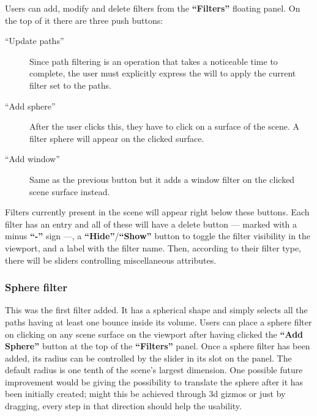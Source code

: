 Users can add, modify and delete filters from the \textbf{“Filters”} floating panel. On the top of it there are three push buttons:
\begin{description}
	\item[“Update paths”] Since path filtering is an operation that takes a noticeable time to complete, the user must explicitly express the will to apply the current filter set to the paths.
	\item[“Add sphere”] After the user clicks this, they have to click on a surface of the scene. A filter sphere will appear on the clicked surface.
	\item[“Add window”] Same as the previous button but it adds a window filter on the clicked scene surface instead.
\end{description}
Filters currently present in the scene will appear right below these buttons. Each filter has an entry and all of these will have a delete button --- marked with a minus \textbf{“-”} sign ---, a \textbf{“Hide”}/\textbf{“Show”} button to toggle the filter visibility in the viewport, and a label with the filter name. Then, according to their filter type, there will be sliders controlling miscellaneous attributes.

\subsubsection{Sphere filter}
This was the first filter added. It has a spherical shape and simply selects all the paths having at least one bounce inside its volume. Users can place a sphere filter on clicking on any scene surface on the viewport after having clicked the \textbf{“Add Sphere”} button at the top of the \textbf{“Filters”} panel. Once a sphere filter has been added, its radius can be controlled by the slider in its slot on the panel. The default radius is one tenth of the scene's largest dimension. One possible future improvement would be giving the possibility to translate the sphere after it has been initially created; might this be achieved through 3d gizmos or just by dragging, every step in that direction should help the usability.

